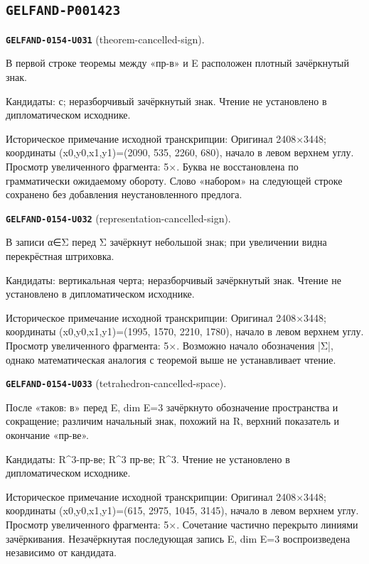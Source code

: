 \subsection*{\texttt{GELFAND-P001423}}
\par\noindent\leavevmode{}\label{GELFAND-0154-U031}\textbf{\texttt{GELFAND-0154-U031}} (theorem-cancelled-sign).\nopagebreak[4]\par
В первой строке теоремы между «пр-в» и E расположен плотный зачёркнутый знак.\par
Кандидаты: с; неразборчивый зачёркнутый знак. Чтение не установлено в дипломатическом исходнике.\par
Историческое примечание исходной транскрипции: Оригинал 2408×3448; координаты (x0,y0,x1,y1)=(2090, 535, 2260, 680), начало в левом верхнем углу. Просмотр увеличенного фрагмента: 5×. Буква не восстановлена по грамматически ожидаемому обороту. Слово «набором» на следующей строке сохранено без добавления неустановленного предлога.\par\medskip
\par\noindent\leavevmode{}\label{GELFAND-0154-U032}\textbf{\texttt{GELFAND-0154-U032}} (representation-cancelled-sign).\nopagebreak[4]\par
В записи α∈Σ перед Σ зачёркнут небольшой знак; при увеличении видна перекрёстная штриховка.\par
Кандидаты: вертикальная черта; неразборчивый зачёркнутый знак. Чтение не установлено в дипломатическом исходнике.\par
Историческое примечание исходной транскрипции: Оригинал 2408×3448; координаты (x0,y0,x1,y1)=(1995, 1570, 2210, 1780), начало в левом верхнем углу. Просмотр увеличенного фрагмента: 5×. Возможно начало обозначения |Σ|, однако математическая аналогия с теоремой выше не устанавливает чтение.\par\medskip
\par\noindent\leavevmode{}\label{GELFAND-0154-U033}\textbf{\texttt{GELFAND-0154-U033}} (tetrahedron-cancelled-space).\nopagebreak[4]\par
После «таков: в» перед E, dim E=3 зачёркнуто обозначение пространства и сокращение; различим начальный знак, похожий на R, верхний показатель и окончание «пр-ве».\par
Кандидаты: R\textasciicircum{}3-пр-ве; R\textasciicircum{}3 пр-ве; R\textasciicircum{}3. Чтение не установлено в дипломатическом исходнике.\par
Историческое примечание исходной транскрипции: Оригинал 2408×3448; координаты (x0,y0,x1,y1)=(615, 2975, 1045, 3145), начало в левом верхнем углу. Просмотр увеличенного фрагмента: 5×. Сочетание частично перекрыто линиями зачёркивания. Незачёркнутая последующая запись E, dim E=3 воспроизведена независимо от кандидата.\par\medskip
